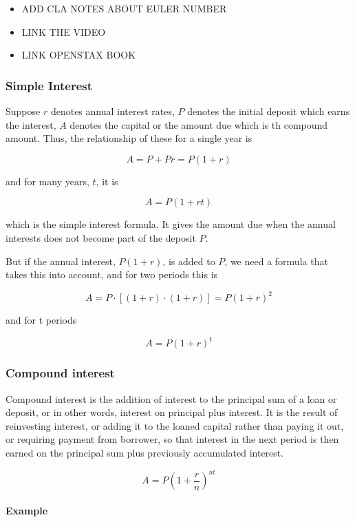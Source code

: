 \documentclass[
  12pt,
  oneside]{book}
\providecommand{\tightlist}{%
  \setlength{\itemsep}{0pt}\setlength{\parskip}{0pt}}
\theoremstyle{definition}
\theoremstyle{definition}
\theoremstyle{definition}
\theoremstyle{definition}
\theoremstyle{remark}
\begin{document}
\begin{itemize}
\tightlist
\item
  ADD CLA NOTES ABOUT EULER NUMBER
\item
  LINK THE VIDEO
\item
  LINK OPENSTAX BOOK
\end{itemize}

\hypertarget{simple-interest}{%
\subsubsection{Simple Interest}\label{simple-interest}}

Suppose \(r\) denotes annual interest rates, \(P\) denotes the initial deposit which earns the interest, \(A\) denotes the capital or the amount due which is th compound amount. Thus, the relationship of these for a single year is

\[
A=P+Pr=P(1+r)
\]

and for many years, \(t\), it is

\[
A=P(1+rt)
\]

which is the simple interest formula. It gives the amount due when the annual interests does not become part of the deposit \(P\).

But if the annual interest, \(P(1+r)\), is added to \(P\), we need a formula that takes this into account, and for two periods this is

\[
A=P\cdot  [(1+r)\cdot(1+r)]=P(1+r)^2
\]

and for t periods

\[
A=P(1+r)^t
\]

\hypertarget{compound-interest}{%
\subsubsection{Compound interest}\label{compound-interest}}

Compound interest is the addition of interest to the principal sum of a loan or deposit, or in other words, interest on principal plus interest. It is the result of reinvesting interest, or adding it to the loaned capital rather than paying it out, or requiring payment from borrower, so that interest in the next period is then earned on the principal sum plus previously accumulated interest.

\[
A=P\left(1+\frac{r}{n}\right)^{nt}
\]

\hypertarget{example}{%
\paragraph*{Example}\label{example}}
\end{document}
